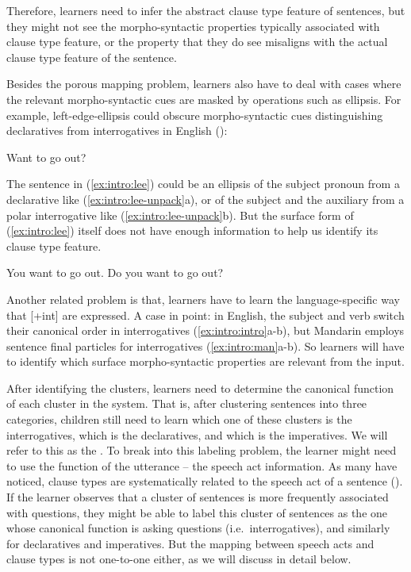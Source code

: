 Therefore, learners need to infer the abstract clause type feature of sentences, but they might not see the morpho-syntactic properties typically associated with clause type feature, or the property that they do see misaligns with the actual clause type feature of the sentence.

Besides the porous mapping problem, learners also have to deal with cases where the relevant morpho-syntactic cues are masked by operations such as ellipsis.  For example, left-edge-ellipsis could obscure morpho-syntactic cues distinguishing declaratives from interrogatives in English (\cite{zwickypullum1983leftedge}):

Want to go out?
\eex

The sentence in (\ref{ex:intro:lee}) could be an ellipsis of  the subject pronoun from a declarative like (\ref{ex:intro:lee-unpack}a), or of the subject and the auxiliary from a polar interrogative like (\ref{ex:intro:lee-unpack}b). But the surface form of (\ref{ex:intro:lee}) itself does not have enough information to help us identify its clause type feature. 

\bxl
You want to go out.
\ex Do you want to go out?
\exl
\eex


Another related problem is that, learners have to learn the language-specific way that [+int] are expressed. A case in point: in English, the subject and verb switch their canonical order in interrogatives (\ref{ex:intro:intro}a-b), but Mandarin employs sentence final particles for interrogatives (\ref{ex:intro:man}a-b). So learners will have to identify which surface morpho-syntactic properties are relevant from the input.  


After identifying the clusters, learners need to determine the canonical function of each cluster in the system. That is, after clustering sentences into three categories, children still need to learn which one of these clusters is the interrogatives, which is the declaratives, and which is the imperatives. We will refer to this as the . To break into this labeling problem, the learner might need to use the function of the utterance -- the speech act information. As many have noticed, clause types are systematically related to the speech act of a sentence (\cite{katzpostal1964, sz1985speechact}). If the learner observes that a cluster of sentences is more frequently associated with questions, they might be able to label this cluster of sentences as the one whose canonical function is asking questions (i.e.\ interrogatives), and similarly for declaratives and imperatives. But the mapping between speech acts and clause types is not one-to-one either, as we will discuss in detail below.




